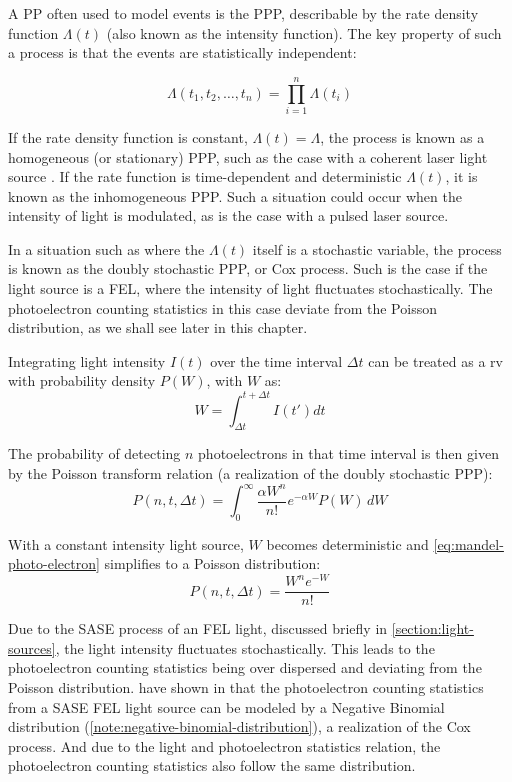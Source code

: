 A \gls{PP} often used to model events is the \gls{PPP}, describable by the rate density function $\Lambda(t)$ (also known as the intensity function). The key property of such a process is that the events are statistically independent:

\begin{equation}
    \Lambda(t_1, t_2, \dots, t_n) = \prod_{i=1}^{n} \Lambda(t_i)
\end{equation}

If the rate density function is constant, $\Lambda(t) = \Lambda$, the process is known as a homogeneous (or stationary) \gls{PPP}, such as the case with a coherent laser light source \cite{salehPhotoelectronStatistics1978}. If the rate function is time-dependent and deterministic $\Lambda(t)$, it is known as the inhomogeneous \gls{PPP}. Such a situation could occur when the intensity of light is modulated, as is the case with a pulsed laser source.

In a situation such as where the $\Lambda(t)$ itself is a stochastic variable, the process is known as the doubly stochastic \gls{PPP}, or Cox process. Such is the case if the light source is a \gls{FEL}, where the intensity of light fluctuates stochastically. The photoelectron counting statistics in this case deviate from the Poisson distribution, as we shall see later in this chapter.

Integrating light intensity $I(t)$ over the time interval $\Delta t$ can be treated as a \gls{rv} with probability density $P(W)$, with $W$ as:
\begin{equation}
    W = \int_{\Delta t}^{t+\Delta t} I(t') dt
\end{equation}

The probability of detecting $n$ photoelectrons in that time interval is then given by the Poisson transform relation \cite{mehtaVIIITheoryPhotoelectron1970} (a realization of the doubly stochastic \gls{PPP}):
\begin{equation}\label{eq:mandel-photo-electron}
    P(n, t, \Delta t) = \int_{0}^{\infty} \frac{\alpha W^n}{n!} e^{-\alpha W} P(W) \, dW
\end{equation}

With a constant intensity light source, $W$ becomes deterministic and \cref{eq:mandel-photo-electron} simplifies to a Poisson distribution:
\begin{equation}
    P(n, t, \Delta t) = \frac{W^n e^{-W}}{n!} 
\end{equation}

Due to the \gls{SASE} process of an \gls{FEL} light, discussed briefly in \cref{section:light-sources}, the light intensity fluctuates stochastically. This leads to the photoelectron counting statistics being over dispersed and deviating from the Poisson distribution. \citeauthor{saldinStatisticalPropertiesRadiation1998} have shown in \cite{saldinStatisticalPropertiesRadiation1998} that the photoelectron counting statistics from a \gls{SASE} \gls{FEL} light source can be modeled by a Negative Binomial distribution (\cref{note:negative-binomial-distribution}), a realization of the Cox process. And due to the light and photoelectron statistics relation, the photoelectron counting statistics also follow the same distribution.

